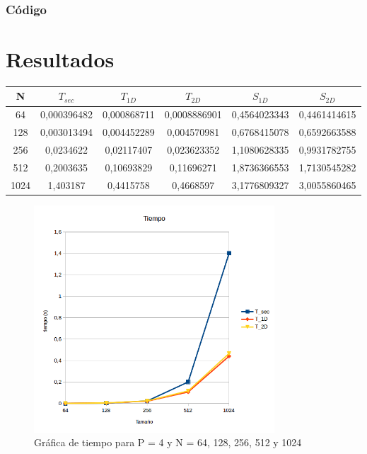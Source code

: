 \subsubsection{Código}



\section{Resultados}

\begin{tabular}{ | c | c c c | c c | }
	\hline
	N		&	$ T_{sec} $	&	$ T_{1D} $	&	$ T_{2D} $	 &	$ S_{1D} $	 &	$ S_{2D} $	\\
	\hline
	64      &	0,000396482 &	0,000868711 &	0,0008886901 &	0,4564023343 &	0,4461414615	\\
	128     &	0,003013494 &	0,004452289 &	0,004570981  &	0,6768415078 &	0,6592663588	\\
	256     &	0,0234622   &	0,02117407  &	0,023623352  &	1,1080628335 &	0,9931782755	\\
	512     &	0,2003635   &	0,10693829  &	0,11696271   &	1,8736366553 &	1,7130545282	\\
	1024    &	1,403187    &	0,4415758   &	0,4668597    &	3,1776809327 &	3,0055860465	\\
	\hline
\end{tabular}

\begin{figure}[H]
	\centering
	\includegraphics[width=9cm]{img/tiempo}
	\caption{Gráfica de tiempo para P = 4 y N = 64, 128, 256, 512 y 1024}
	\label{fig:grafica_tiempo}
\end{figure}

